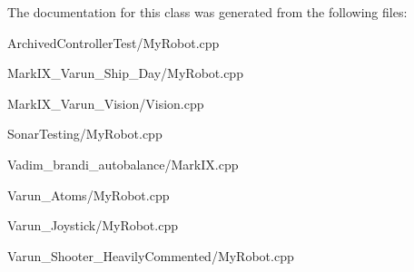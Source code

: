The documentation for this class was generated from the following files\-:\begin{DoxyCompactItemize}
\item 
Archived\-Controller\-Test/My\-Robot.\-cpp\item 
Mark\-I\-X\-\_\-\-Varun\-\_\-\-Ship\-\_\-\-Day/My\-Robot.\-cpp\item 
Mark\-I\-X\-\_\-\-Varun\-\_\-\-Vision/Vision.\-cpp\item 
Sonar\-Testing/My\-Robot.\-cpp\item 
Vadim\-\_\-brandi\-\_\-autobalance/Mark\-I\-X.\-cpp\item 
Varun\-\_\-\-Atoms/My\-Robot.\-cpp\item 
Varun\-\_\-\-Joystick/My\-Robot.\-cpp\item 
Varun\-\_\-\-Shooter\-\_\-\-Heavily\-Commented/My\-Robot.\-cpp\end{DoxyCompactItemize}
